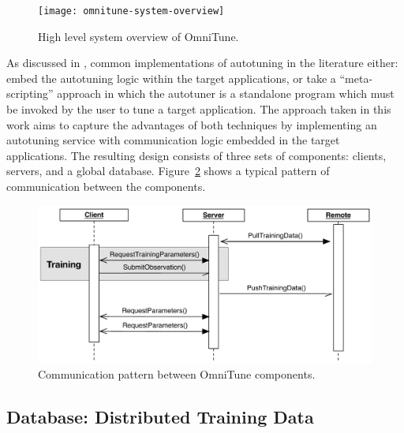 
\begin{figure}
\centering
\texttt{[image: omnitune-system-overview]}
\caption{%
  High level system overview of OmniTune.%
}
\label{fig:omnitune-system-overview}
\end{figure}

As discussed in , common implementations of
autotuning in the literature either: embed the autotuning logic within
the target applications, or take a ``meta-scripting'' approach in
which the autotuner is a standalone program which must be invoked by
the user to tune a target application. The approach taken in this work
aims to capture the advantages of both techniques by implementing an
autotuning service with communication logic embedded in the target
applications. The resulting design consists of three sets of
components: clients, servers, and a global
database. Figure~\ref{fig:omnitune-comms} shows a typical pattern of
communication between the components.

\begin{figure}
\centering
\includegraphics[width=\textwidth]{img/omnitune-comms.pdf}
\caption{%
  Communication pattern between OmniTune components.%
}
\label{fig:omnitune-comms}
\end{figure}



\subsection{Database: Distributed Training Data}

